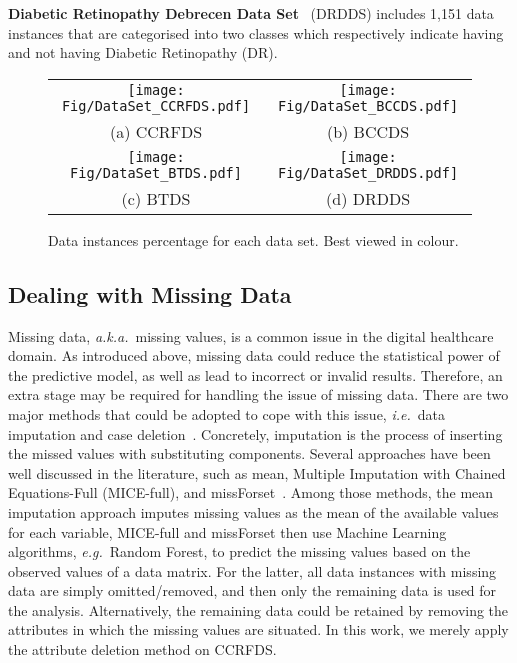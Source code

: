 \documentclass{article}
\newcommand{\zzie}{\emph{i.e.}~}
\newcommand{\zzeg}{\emph{e.g.}~}
\newcommand{\zzaka}{\emph{a.k.a.}~}
\newcommand*{\1}{\textcolor{magenta}}
\begin{document}
\textbf{Diabetic Retinopathy Debrecen Data Set}~\cite{DiabeticRetinopathyDebrecenDS2014} (DRDDS) includes 1,151 data instances that are categorised into two classes which respectively indicate having and not having Diabetic Retinopathy (DR).
	\begin{figure}[!ht]
		\setlength{\tabcolsep}{-8pt}
		\centering
		\begin{tabular}{cc}
			\hspace{-0.3em}\texttt{[image: Fig/DataSet\_CCRFDS.pdf]} & \texttt{[image: Fig/DataSet\_BCCDS.pdf]}\\
			(a) CCRFDS & (b) BCCDS\\
			\hspace{-0.3em}\texttt{[image: Fig/DataSet\_BTDS.pdf]} & \texttt{[image: Fig/DataSet\_DRDDS.pdf]}\\
			(c) BTDS & (d) DRDDS
		\end{tabular}
		\caption{Data instances percentage for each data set. Best viewed in colour.}
		\label{fig:DS}
	\end{figure}
	
	\subsection{Dealing with Missing Data}\label{sec:missingvalues}
	Missing data, \zzaka missing values, is a common issue in the digital healthcare domain. As introduced above, missing data could reduce the statistical power of the predictive model, as well as lead to incorrect or invalid results. Therefore, an extra stage may be required for handling the issue of missing data. There are two major methods that could be adopted to cope with this issue, \zzie data imputation and case deletion~\cite{kang2013prevention}. Concretely, imputation is the process of inserting the missed values with substituting components. Several approaches have been well discussed in the literature, such as mean, Multiple Imputation with Chained Equations-Full (MICE-full), and missForset~\cite{luo2016using}. Among those methods, the mean imputation approach imputes missing values as the mean of the available values for each variable, MICE-full and missForset then use Machine Learning algorithms, \zzeg Random Forest, to predict the missing values based on the observed values of a data matrix. For the latter, all data instances with missing data are simply omitted/removed, and then only the remaining data is used for the analysis. Alternatively, the remaining data could be retained by removing the attributes in which the missing values are situated. In this work, we merely apply the attribute deletion method on CCRFDS.
	
\end{document}
